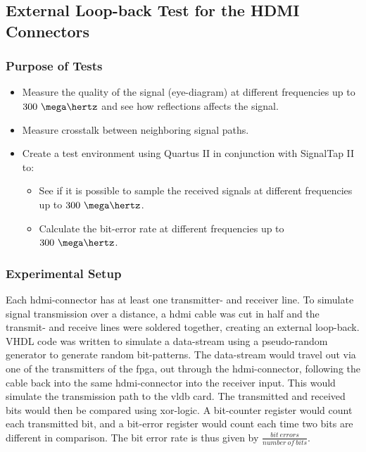\documentclass[main.tex]{subfiles}
\begin{document}
\subsection{External Loop-back Test for the HDMI Connectors} \label{test:loopbackhdmi}

\subsubsection{Purpose of Tests}

\begin{itemize}\setlength{\itemsep}{10pt}
\item Measure the quality of the signal (eye-diagram) at different frequencies up to $300~\mega\hertz$ and see how reflections affects the signal.
\item Measure crosstalk between neighboring signal paths.
\item Create a test environment using Quartus II in conjunction with SignalTap II to:
\begin{itemize}\setlength{\itemsep}{10pt}
  \item See if it is possible to sample the received signals at different frequencies up to $300~\mega\hertz$.
  \item Calculate the bit-error rate at different frequencies up to $300~\mega\hertz$.
\end{itemize}
\end{itemize}

\subsubsection{Experimental Setup}

Each \gls{hdmi}-connector has at least one transmitter- and receiver line. To simulate signal transmission over a distance, a \gls{hdmi} cable was cut in half and the transmit- and receive lines were soldered together, creating an external loop-back. VHDL code was written to simulate a data-stream using a pseudo-random generator to generate random bit-patterns. The data-stream would travel out via one of the transmitters of the \gls{fpga}, out through the \gls{hdmi}-connector, following the cable back into the same \gls{hdmi}-connector into the receiver input. This would simulate the transmission path to the \gls{vldb} card. The transmitted and received bits would then be compared using xor-logic. A bit-counter register would count each transmitted bit, and a bit-error register would count each time two bits are different in comparison. The bit error rate is thus given by $\frac{bit~errors}{number~of~bits}$.
\end{document}
